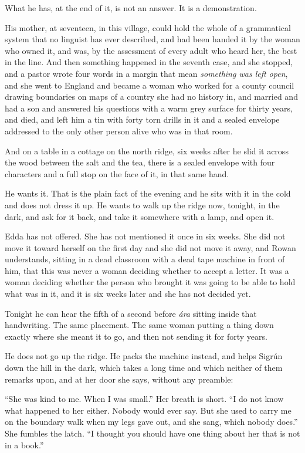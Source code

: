 \documentclass[11pt,oneside]{book}
\begin{document}
What he has, at the end of it, is not an answer. It is a demonstration.

His mother, at seventeen, in this village, could hold the whole of a
grammatical system that no linguist has ever described, and had been
handed it by the woman who owned it, and was, by the assessment of every
adult who heard her, the best in the line. And then something happened
in the seventh case, and she stopped, and a pastor wrote four words in a
margin that mean \emph{something was left open}, and she went to England
and became a woman who worked for a county council drawing boundaries
on maps of a country she had no history in, and married and had a son
and answered his questions with a warm grey surface for thirty years,
and died, and left him a tin with forty torn drills in it and a sealed
envelope addressed to the only other person alive who was in that room.

And on a table in a cottage on the north ridge, six weeks after he slid
it across the wood between the salt and the tea, there is a sealed
envelope with four characters and a full stop on the face of it, in that
same hand.

He wants it. That is the plain fact of the evening and he sits with it
in the cold and does not dress it up. He wants to walk up the ridge now,
tonight, in the dark, and ask for it back, and take it somewhere with a
lamp, and open it.

Edda has not offered. She has not mentioned it once in six weeks. She
did not move it toward herself on the first day and she did not move it
away, and Rowan understands, sitting in a dead classroom with a dead
tape machine in front of him, that this was never a woman deciding
whether to accept a letter. It was a woman deciding whether the person
who brought it was going to be able to hold what was in it, and it is
six weeks later and she has not decided yet.

Tonight he can hear the fifth of a second before \emph{ára} sitting
inside that handwriting. The same placement. The same woman putting a
thing down exactly where she meant it to go, and then not sending it for
forty years.

He does not go up the ridge. He packs the machine instead, and helps
Sigrún down the hill in the dark, which takes a long time and which
neither of them remarks upon, and at her door she says, without any
preamble:

``She was kind to me. When I was small.'' Her breath is short. ``I do
not know what happened to her either. Nobody would ever say. But she
used to carry me on the boundary walk when my legs gave out, and she
sang, which nobody does.'' She fumbles the latch. ``I thought you should
have one thing about her that is not in a book.''
\end{document}
